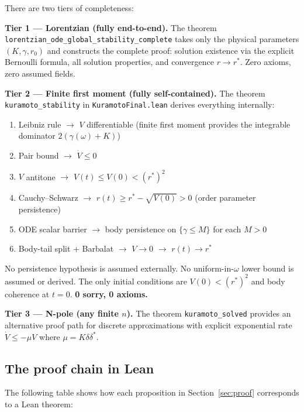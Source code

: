 \documentclass[11pt,a4paper]{article}
\theoremstyle{definition}
\begin{document}
There are two tiers of completeness:

\medskip\noindent\textbf{Tier 1 --- Lorentzian (fully end-to-end).} The theorem \texttt{lorentzian\_ode\_global\_stability\_complete} takes only the physical parameters $(K, \gamma, r_0)$ and constructs the complete proof: solution existence via the explicit Bernoulli formula, all solution properties, and convergence $r \to r^*$. Zero axioms, zero assumed fields.

\medskip\noindent\textbf{Tier 2 --- Finite first moment (fully self-contained).} The theorem \texttt{kuramoto\_stability} in \texttt{KuramotoFinal.lean} derives everything internally:
\begin{enumerate}
\item Leibniz rule $\to$ $V$ differentiable (finite first moment provides the integrable dominator $2(\gamma(\omega) + K)$)
\item Pair bound $\to$ $\dot{V} \leq 0$
\item $V$ antitone $\to$ $V(t) \leq V(0) < (r^*)^2$
\item Cauchy--Schwarz $\to$ $r(t) \geq r^* - \sqrt{V(0)} > 0$ (order parameter persistence)
\item ODE scalar barrier $\to$ body persistence on $\{\gamma \leq M\}$ for each $M > 0$
\item Body-tail split + Barbalat $\to$ $V \to 0$ $\to$ $r(t) \to r^*$
\end{enumerate}
No persistence hypothesis is assumed externally. No uniform-in-$\omega$ lower bound is assumed or derived. The only initial conditions are $V(0) < (r^*)^2$ and body coherence at $t = 0$. \textbf{0 sorry, 0 axioms.}

\medskip\noindent\textbf{Tier 3 --- N-pole (any finite $n$).} The theorem \texttt{kuramoto\_solved} provides an alternative proof path for discrete approximations with explicit exponential rate $\dot{V} \leq -\mu V$ where $\mu = K\delta\delta^*$.

\subsection{The proof chain in Lean}

The following table shows how each proposition in Section~\ref{sec:proof} corresponds to a Lean theorem:
\end{document}
